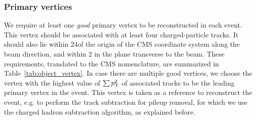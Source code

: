 



% 

\subsubsection{Primary vertices \label{sec:object_vertex}}

We require at least one {\it good} primary vertex to be reconstructed in each event. 
This vertex should be associated with at least four charged-particle tracks. It should also lie
within 24\cm of the origin of the CMS coordinate system along the beam direction, and within 2\cm
in the plane transverse to the beam. 
These requirements, translated to the CMS nomenclature, are summarized in
Table~\ref{tab:object_vertex}.
In case there are multiple good vertices, we choose the vertex with the highest value of $\sum
p_{\mathrm{T}}^2$ of associated tracks to be the leading primary vertex in the event. This vertex is
taken as a reference to reconstruct the event, e.g. to perform the track subtraction for pileup
removal, for which we use the charged hadron subtraction algorithm, as explained before.

